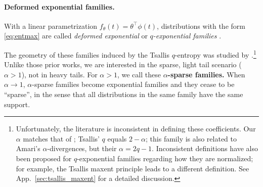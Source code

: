 \documentclass{article}
\newcommand{\remove}[1]{}
\begin{document}
\paragraph{Deformed exponential families.} 
With a linear parametrization $f_\theta(t) = \theta^\top\phi(t)$, 
distributions with the form \eqref{eq:entmax} are called \textit{deformed exponential} or \textit{$q$-exponential families} \citep{naudts2009q,sears2010generalized,ding2010t,matsuzoe2012geometry}. 
\remove{
also referred to as a \textit{$t$-exponential family} \citep{ding2010t} and a \textit{$q$-exponential family} \citep{matsuzoe2012geometry}. 
}
The geometry of these families induced by the Tsallis $q$-entropy was studied by \citet[\S 4.3]{amari2016information}.\footnote{Unfortunately, the literature is inconsistent in defining these coefficients. Our $\alpha$ matches that of \citet{blondel2020learning}; Tsallis' $q$ equals $2-\alpha$; this family is also related to Amari's $\alpha$-divergences, but their $\alpha = 2q - 1$. Inconsistent definitions have also been proposed for $q$-exponential families regarding how they are normalized; for example, the Tsallis maxent principle leads to a different definition. See App.~\ref{sec:tsallis_maxent} for a detailed discussion.} 
Unlike those prior works, we are interested in the sparse, light tail scenario ($\alpha>1$), not in heavy tails. For $\alpha>1$, we call these {\bf $\alpha$-sparse families.} 
When $\alpha \rightarrow 1$, $\alpha$-sparse families become exponential families and they cease to be ``sparse'', in the sense that all distributions in the same family have the same support.

\begin{comment}
In particular, a 2-sparse family takes the form:
\begin{equation}\label{eq:sparse_family}
    p_\theta(t) = [\theta^\top \phi(t) - A_2(\theta) + 1]_+,
\end{equation}
where 
$A_2(\theta) = 1+ \Bigl(-1 + {\textstyle \int_{\mathrm{supp}(p_{\theta})} \theta^\top \phi(t)}\Bigr)/|\mathrm{supp}(p_{\theta})|$.
Note that $\theta^\top\! \phi(t)  - A_\alpha(\theta) = \log_{2-\alpha}(p_\theta(t))$ and that
$A_1(\theta) \!=\! {\displaystyle \lim_{\alpha\rightarrow 1}} A_\alpha(\theta) = \log \int_S \exp(\theta^\top \phi(t))$ is the log-partition function (see \eqref{eq:boltzmann}).
\end{comment}
\end{document}
